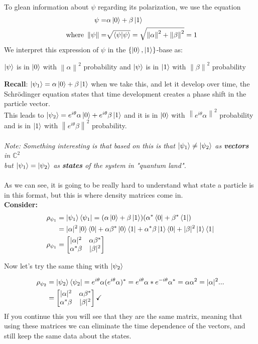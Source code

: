 \documentclass[12pt]{article}
\theoremstyle{plain}
\theoremstyle{nonumberplain}
\theoremstyle{plain}
\theoremstyle{nonumberplain}
\newcommand\1{{\bf 1}}
\newcommand{\bmat}[1]{\begin{bmatrix*} #1 \end{bmatrix*}} %
\newcommand{\C}{\mathbb{C}} %
\newcommand{\<}{\left\langle}
\renewcommand{\>}{\right\rangle}
\newcommand{\norm}[1]{\left\lVert#1\right\rVert} %
\begin{document}
To glean information about $\psi$ regarding its polarization, we use the equation
\begin{align*}
\psi = &\alpha\ket{0} + \beta\ket{1}\\
\text{ where } \norm{\psi} = &\sqrt{\braket{\psi|\psi}} = \sqrt{\norm{\alpha}^2+\norm{\beta}^2} = 1
\end{align*}
We interpret this expression of $\psi$ in the $\{\ket{0}, \ket{1}\}$-base as: 
\begin{center}
$\ket{\psi}$ is in $\ket{0}$ with $\norm{\alpha}^2$ probability    and     $\ket{\psi}$ is in $\ket{1}$ with $\norm{\beta}^2$ probability 
\end{center}
\textbf{Recall}: $\ket{\psi_1} = \alpha\ket{0} + \beta\ket{1}$ when we take this, and let it develop over time, the Schrödinger equation states that time development creates a phase shift in the particle vector.\\
This leads to $\ket{\psi_2} = e^{i\theta}\alpha\ket{0} + e^{i\theta}\beta\ket{1}$ and it is in $\ket{0}$ with $\norm{e^{i\theta}\alpha}^2$ probability and is in $\ket{1}$ with $\norm{e^{i\theta}\beta}^2$ probability.\\
\\
\textit{Note: Something interesting is that based on this is that $\ket{\psi_1} \neq \ket{\psi_2}$ as \textbf{vectors} in $\C^2$\\
but $\ket{\psi_1} = \ket{\psi_2}$ as \textbf{states} of the system in "quantum land".}\\
\\


As we can see, it is going to be really hard to understand what state a particle is in this format, but this is where density matrices come in.\\
\textbf{Consider:}
\begin{align*}
\rho_{\psi_1} &= \ket{\psi_1}\bra{\psi_1} = (\alpha\ket{0} + \beta\ket{1})(\alpha^*\bra{0} + \beta^*\bra{1})\\
&= |\alpha|^2\ket{0}\bra{0} + \alpha\beta^*\ket{0}\bra{1} + \alpha^*\beta\ket{1}\bra{0} + |\beta|^2\ket{1}\bra{1}\\
\rho_{\psi_1} &= \bmat{|\alpha|^2 &\alpha\beta^*\\ \alpha^*\beta &|\beta|^2} 
\end{align*}
\begin{center}
Now let's try the same thing with $\ket{\psi_2}$
\end{center}
\begin{align*}
\rho_{\psi_2} &= \ket{\psi_2}\bra{\psi_2} = e^{i\theta}\alpha(e^{i\theta}\alpha)^* = e^{i\theta}\alpha * e^{-i\theta}\alpha^* = \alpha\alpha^2 = |\alpha|^2...\\
&= \bmat{|\alpha|^2 &\alpha\beta^*\\ \alpha^*\beta &|\beta|^2}  \checkmark
\end{align*}
If you continue this you will see that they are the same matrix, meaning that using these matrices we can eliminate the time dependence of the vectors, and still keep the same data about the states.
\end{document}
